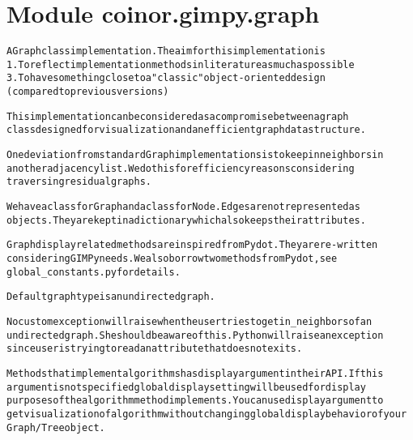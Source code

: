 %
%
%


\section{Module coinor.gimpy.graph}

    \label{coinor:gimpy:graph}
\begin{alltt}

A Graph class implementation. The aim for this implementation is
1. To reflect implementation methods in literature as much as possible
3. To have something close to a "classic" object-oriented design
(compared to previous versions)

This implementation can be considered as a compromise between a graph
class designed for visualization and an efficient graph data structure.

One deviation from standard Graph implementations is to keep in neighbors in
an other adjacency list. We do this for efficiency reasons considering
traversing residual graphs.

We have a class for Graph and a class for Node. Edges are not represented as
objects. They are kept in a dictionary which also keeps their attributes.

Graph display related methods are inspired from Pydot. They are re-written
considering GIMPy needs. We also borrow two methods from Pydot, see
global\_constants.py for details.

Default graph type is an undirected graph.

No custom exception will raise when the user tries to get in\_neighbors of an
undirected graph. She should be aware of this. Python will raise an exception
since user is trying to read an attribute that does not exits.

Methods that implement algorithms has display argument in their API. If this
argument is not specified global display setting will be used for display
purposes of the algorithm method implements. You can use display argument to
get visualization of algorithm without changing global display behavior of your
Graph/Tree object.


\end{alltt}
